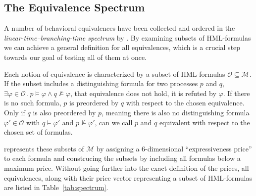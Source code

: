 \subsection{The Equivalence Spectrum}

A number of behavioral equivalences have been collected and ordered
in the \emph{linear-time--branching-time spectrum} %
by \textcite{glabbeek1990spectrum}.
By examining subsets of HML-formulas we can achieve a general definition
for all equivalences,
which is a crucial step towards our goal of testing all of them at once.

Each notion of equivalence is characterized by a subset of HML-formulas
$\mathcal{O} \subseteq \mathcal{M}$.
If the subset includes a distinguishing formula for two processes $p$ and $q$,
$\exists \varphi \in \mathcal{O}\,.\,
    p \models \varphi \wedge q \not\models \varphi$,
that equivalence does not hold, it is refuted by $\varphi$.
If there is no such formula,
$p$ is preordered by $q$ with respect to the chosen equivalence.
Only if $q$ is also preordered by $p$,
meaning there is also no distinguishing formula $\varphi' \in \mathcal{O}$
with $q \models \varphi'$ and $p \not\models \varphi'$,
can we call $p$ and $q$ equivalent with respect to the chosen set of formulas.

\textcite{bisping2023process} represents these subsets of $\mathcal{M}$
by assigning a 6-dimensional \enquote{expressiveness price} to each formula
and construcing the subsets by including all formulas below a maximum price.
Without going further into the exact definition of the prices,
all equivalences, along with their price vector representing a subset of
HML-formulas are listed in Table~\ref{tab:spectrum}.

